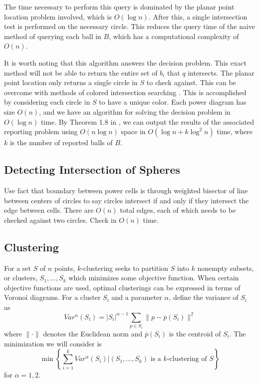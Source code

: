 \documentclass[a4paper, 11pt]{article}
\begin{document}
The time necessary to perform this query is dominated by the planar point location problem involved, which is $O(\log n)$. After this, a single
intersection test is performed on the necessary circle. This reduces the query time of the naive method of querying each ball in $B$, which has a
computational complexity of $O(n)$.

It is worth noting that this algorithm answers the decision problem. This exact method will not be able to return the entire set of $b_i$ that $q$
intersects. The planar point location only returns a single circle in $S$ to check against. This can be overcome with methods of colored intersection
searching \cite{ravi}. This is accomplished by considering each circle in $S$ to have a unique color. Each power diagram has size $O(n)$, and we have
an algorithm for solving the decision problem in $O(\log n)$ time. By Theorem 1.8 in \cite{ravi}, we can output the results of the associated reporting problem using $O(n
\log n)$ space in $O(\log n +k \log^2 n)$ time, where $k$ is the number of reported balls of $B$.

\subsection{Detecting Intersection of Spheres}

Use fact that boundary between power cells is through weighted bisector of line between centers of circles to say circles intersect if and only if
they intersect the edge between cells. There are $O(n)$ total edges, each of which needs to be checked against two circles. Check in $O(n)$ time.

\subsection{Clustering}

For a set $S$ of $n$ points, $k$-clustering seeks to partition $S$ into $k$ nonempty subsets, or clusters, $S_1, \dots, S_k$ which minimizes some objective
function. When certain objective functions are used, optimal clusterings can be expressed in terms of Voronoi diagrams. For a cluster $S_i$ and a
parameter $\alpha$, define
the variance of $S_i$ as
\begin{equation}
  Var^\alpha(S_i) = |S_i|^{\alpha-1} \sum_{p \in S_i} \| p - \overline{p}(S_i) \|^2
  \label{def:var}
\end{equation}
where $\| \cdot \|$ denotes the Euclidean norm and $\overline{p}(S_i)$ is the centroid of $S_i$. The minimization we will consider is
\begin{equation}
  \min \left\{ \sum_{i=1}^k Var^\alpha (S_i) | (S_1,\dots, S_k) \text{ is a $k$-clustering of } S \right\}
  \label{eq:cluster}
\end{equation}
for $\alpha = 1,2$.
\end{document}
